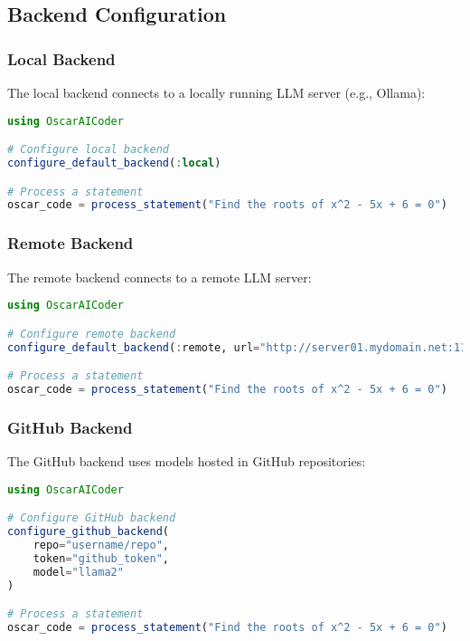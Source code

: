 \documentclass[11pt,a4paper]{article}
\begin{document}
\subsection{Backend Configuration}

\subsubsection{Local Backend}

The local backend connects to a locally running LLM server (e.g., Ollama):

\begin{lstlisting}[language=Julia]
using OscarAICoder

# Configure local backend
configure_default_backend(:local)

# Process a statement
oscar_code = process_statement("Find the roots of x^2 - 5x + 6 = 0")
\end{lstlisting}

\subsubsection{Remote Backend}

The remote backend connects to a remote LLM server:

\begin{lstlisting}[language=Julia]
using OscarAICoder

# Configure remote backend
configure_default_backend(:remote, url="http://server01.mydomain.net:11434")

# Process a statement
oscar_code = process_statement("Find the roots of x^2 - 5x + 6 = 0")
\end{lstlisting}

\subsubsection{GitHub Backend}

The GitHub backend uses models hosted in GitHub repositories:

\begin{lstlisting}[language=Julia]
using OscarAICoder

# Configure GitHub backend
configure_github_backend(
    repo="username/repo",
    token="github_token",
    model="llama2"
)

# Process a statement
oscar_code = process_statement("Find the roots of x^2 - 5x + 6 = 0")
\end{lstlisting}
\end{document}
